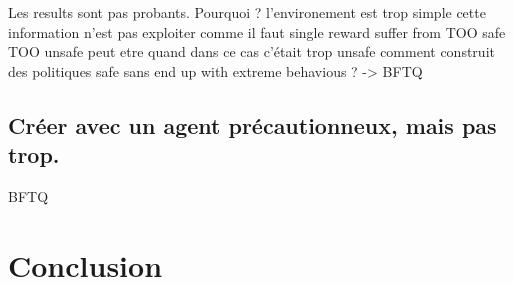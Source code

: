 \documentclass[french]{beamer}
\begin{document}
    \begin{frame}
        Les results sont pas probants.
        Pourquoi ?
            l'environement est trop simple
            cette information n'est pas exploiter comme il faut
                single reward suffer from TOO safe TOO unsafe
                    peut etre quand dans ce cas c'était trop unsafe
                    comment construit des politiques safe sans end up with extreme behavious ? -> BFTQ
    \end{frame}

    \subsection{Créer avec un agent précautionneux, mais pas trop.}

    \begin{frame}

        BFTQ

    \end{frame}

    \section{Conclusion}
    \begin{frame}
    \end{frame}
\end{document}
